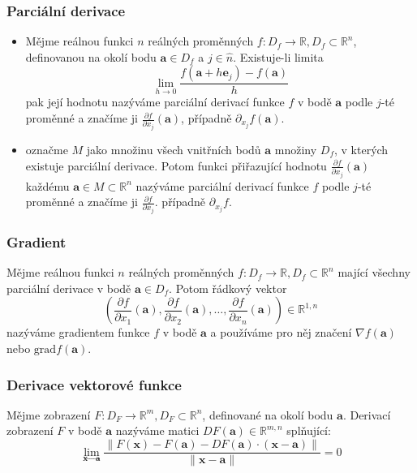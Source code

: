 \subsubsection*{Parciální derivace}
\begin{itemize}
	\item Mějme reálnou funkci $n$ reálných proměnných $f: D_f \rightarrow \mathbb{R}, D_f \subset \mathbb{R}^n$, definovanou na okolí bodu $\textbf{a} \in D_f$ a $j \in \hat{n} $. Existuje-li limita $$\lim_{h\to 0} \frac{f(\textbf{a} + h\textbf{e}_j) - f(\textbf{a})}{h}$$
pak její hodnotu nazýváme parciální derivací funkce $f$ v bodě $\textbf{a}$ podle $j$-té proměnné a značíme ji $\frac{\partial f}{\partial x_j}(\textbf{a})$, případně $\partial_{x_j} f(\textbf{a})$.
	\item označme $M$ jako množinu všech vnitřních bodů $\textbf{a}$ množiny $D_f$, v kterých existuje parciální derivace. Potom funkci přiřazující hodnotu $\frac{\partial f}{\partial x_j}(\textbf{a})$ každému $\textbf{a} \in M \subset \mathbb{R}^n$ nazýváme parciální derivací funkce $f$ podle $j$-té proměnné a značíme ji $\frac{\partial f}{\partial x_j}$. případně $\partial_{x_j} f$.
\end{itemize}

\subsubsection*{Gradient}
Mějme reálnou funkci $n$ reálných proměnných $f: D_f \rightarrow \mathbb{R}, D_f \subset \mathbb{R}^n$ mající všechny parciální derivace v bodě $\textbf{a} \in D_f$. Potom řádkový vektor $$ (\frac{\partial f}{\partial x_1}(\textbf{a}), \frac{\partial f}{\partial x_2}(\textbf{a}), \ldots , \frac{\partial f}{\partial x_n}(\textbf{a})) \in \mathbb{R}^{1,n}$$
nazýváme gradientem funkce $f$ v bodě $\textbf{a}$ a používáme pro něj značení $\nabla f(\textbf{a})$ nebo $\text{grad}f(\textbf{a})$.

\subsubsection*{Derivace vektorové funkce}
Mějme zobrazení $F: D_F \rightarrow \mathbb{R}^m, D_F \subset \mathbb{R}^n$, definované na okolí bodu $\textbf{a}$. Derivací zobrazení $F$ v bodě $\textbf{a}$ nazýváme matici $DF(\textbf{a}) \in \mathbb{R}^{m, n}$ splňující: $$\lim_{\textbf{x}\to \textbf{a}} \frac{\|F(\textbf{x}) - F(\textbf{a}) - DF(\textbf{a})\cdot (\textbf{x} - \textbf{a})\|}{\| \textbf{x} - \textbf{a}\|} = 0$$

